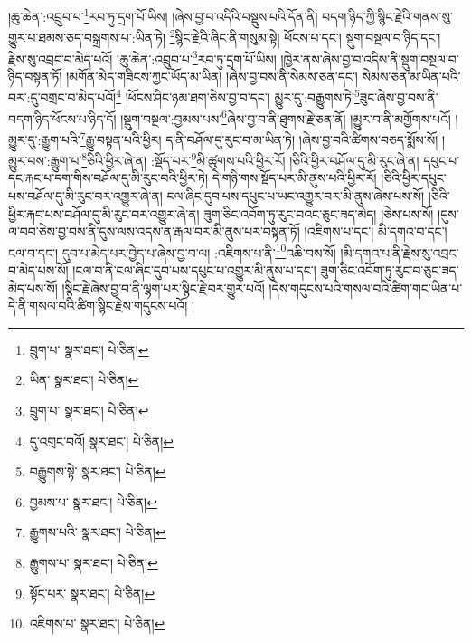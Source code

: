 །ཆུ་ཆེན་:འབྲུབ་པ་\footnote{བྲུག་པ་  སྣར་ཐང་།  པེ་ཅིན། }རབ་ཏུ་དྲག་པོ་ཡིས། །ཞེས་བྱ་བ་འདིའི་བསྡུས་པའི་དོན་ནི། བདག་ཉིད་ཀྱི་སྙིང་རྗེའི་གནས་སུ་གྱུར་པ་ཐམས་ཅད་བསྒྲགས་པ་:ཡིན་ཏེ། \footnote{ཡིན་  སྣར་ཐང་།  པེ་ཅིན། }སྙིང་རྗེའི་ཞིང་ནི་གསུམ་སྟེ། ཕོངས་པ་དང་། སྡུག་བསྔལ་བ་ཉིད་དང་། རྗེས་སུ་འབྲང་བ་མེད་པའོ། །ཆུ་ཆེན་:འབྲུབ་པ་\footnote{བྲུག་པ་  སྣར་ཐང་།  པེ་ཅིན། }རབ་ཏུ་དྲག་པོ་ཡིས། །ཁྱེར་ནས་ཞེས་བྱ་བ་འདིས་ནི་སྡུག་བསྔལ་བ་ཉིད་བསྟན་ཏོ། །མགོན་མེད་གཟིངས་ཀྱང་ཡོད་མ་ཡིན། །ཞེས་བྱ་བས་ནི་སེམས་ཅན་དང་། སེམས་ཅན་མ་ཡིན་པའི་བར་:དུ་བགྲང་བ་མེད་པའོ།\footnote{དུ་འགྲང་བའོ།  སྣར་ཐང་།  པེ་ཅིན། } །ཕོངས་ཤིང་ཉམ་ཐག་ཅེས་བྱ་བ་དང་། མྱུར་དུ་:བརྒྱུགས་ཏེ་\footnote{བརྒྱུགས་སྟེ་  སྣར་ཐང་།  པེ་ཅིན། }ཟུང་ཞེས་བྱ་བས་ནི་བདག་ཉིད་ཕོངས་པ་ཉིད་དོ། །སྡུག་བསྔལ་:བྱམས་པས་\footnote{བྱམས་པ་  སྣར་ཐང་།  པེ་ཅིན། }ཞེས་བྱ་བ་ནི་ཐུགས་རྗེ་ཅན་ནོ། །མྱུར་བ་ནི་མགྱོགས་པའོ། །མྱུར་དུ་:རྒྱུག་པའི་\footnote{རྒྱུགས་པའི་  སྣར་ཐང་།  པེ་ཅིན། }རྒྱུ་བསྟན་པའི་ཕྱིར། ད་ནི་བཤོལ་དུ་རུང་བ་མ་ཡིན་ཏེ། །ཞེས་བྱ་བའི་ཚིགས་བཅད་སྨོས་སོ། །མྱུར་བས་:རྒྱུག་པ་\footnote{རྒྱུགས་པ་  སྣར་ཐང་།  པེ་ཅིན། }ཅིའི་ཕྱིར་ཞེ་ན། :སྡོད་པར་\footnote{སྟོང་པར་  སྣར་ཐང་།  པེ་ཅིན། }མི་ཚུགས་པའི་ཕྱིར་རོ། །ཅིའི་ཕྱིར་བཤོལ་དུ་མི་རུང་ཞེ་ན། དཔུང་པ་དང་རྐང་པ་དག་གིས་བཤོལ་དུ་མི་རུང་བའི་ཕྱིར་ཏེ། དེ་གཉི་གས་སྡོད་པར་མི་ནུས་པའི་ཕྱིར་རོ། །ཅིའི་ཕྱིར་དཔུང་པས་བཤོལ་དུ་མི་རུང་བར་འགྱུར་ཞེ་ན། ངལ་ཞིང་དུབ་པས་དཔུང་པ་ཡང་འགྱུར་བར་མི་ནུས་ཞེས་པས་སོ། །ཅིའི་ཕྱིར་རྐང་པས་བཤོལ་དུ་མི་རུང་བར་འགྱུར་ཞེ་ན། ཟུག་ཅིང་འབོག་ཏུ་རུང་བའང་ཅུང་ཟད་མེད། །ཅེས་པས་སོ། །དུས་ལ་བབ་ཅེས་བྱ་བས་ནི་དུས་ལས་འདས་ན་རྒལ་བར་མི་ནུས་པར་བསྟན་ཏོ། །འཇིགས་པ་དང་། མི་དགའ་བ་དང་། ངལ་བ་དང་། དུབ་པ་མེད་པར་བྱེད་པ་ཞེས་བྱ་བ་ལ། :འཇིགས་པ་ནི་\footnote{འཇིགས་པ་  སྣར་ཐང་།  པེ་ཅིན། }འཆི་བས་སོ། །མི་དགའ་པ་ནི་རྗེས་སུ་འབྲང་བ་མེད་པས་སོ། །ངལ་བ་ནི་ངལ་ཞིང་དུབ་པས་དཔུང་པ་འགྱུར་མི་ནུས་པ་དང་། ཟུག་ཅིང་འབོག་ཏུ་རུང་བ་ཅུང་ཟད་མེད་པས་སོ། །སྙིང་རྗེ་ཞེས་བྱ་བ་ནི་ལྷག་པར་སྙིང་རྗེ་བར་གྱུར་པའོ། །དེས་གདུངས་པའི་གསལ་བའི་ཚིག་གང་ཡིན་པ་དེ་ནི་གསལ་བའི་ཚིག་སྙིང་རྗེས་གདུངས་པའོ། །
